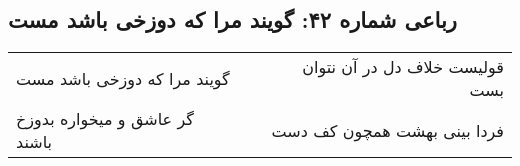 \begin{center}
\section*{رباعی شماره ۴۲: گویند مرا که دوزخی باشد مست}
\label{sec:sh042}
\begin{longtable}{l p{0.5cm} r}
گویند مرا که دوزخی باشد مست
&&
قولیست خلاف دل در آن نتوان بست
\\
گر عاشق و میخواره بدوزخ باشند
&&
فردا بینی بهشت همچون کف دست
\\
\end{longtable}
\end{center}
